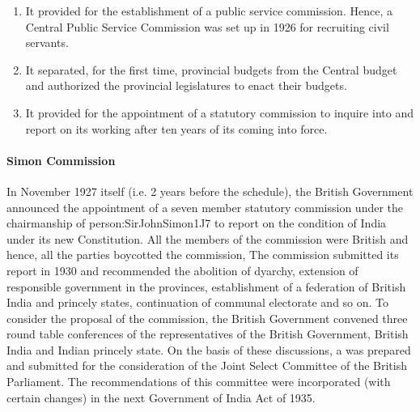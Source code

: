 \begin{enumerate}
  \item It provided for the establishment of a public service commission. Hence, a Central Public Service Commission was set up in 1926 for recruiting civil servants.
  \item It separated, for the first time, provincial budgets from the Central budget and authorized the provincial legislatures to enact their budgets.
  \item It provided for the appointment of a statutory commission to inquire into and report on its working after ten years of its coming into force.
\end{enumerate}

\paragraph{Simon Commission}

In November 1927 itself (i.e. 2 years before the schedule), the British Government announced the appointment of a seven member statutory commission under the chairmanship of \gls{person:SirJohnSimon1J7} to report on the condition of India under its new Constitution. All the members of the commission were British and hence, all the parties boycotted the commission, The commission submitted its report in 1930 and recommended the abolition of dyarchy, extension of responsible government in the provinces, establishment of a federation of British India and princely states, continuation of communal electorate and so on. To consider the proposal of the commission, the British Government convened three round table conferences of the representatives of the British Government, British India and Indian princely state. On the basis of these discussions, a  was prepared and submitted for the consideration of the Joint Select Committee of the British Parliament. The recommendations of this committee were incorporated (with certain changes) in the next Government of India Act of 1935.

